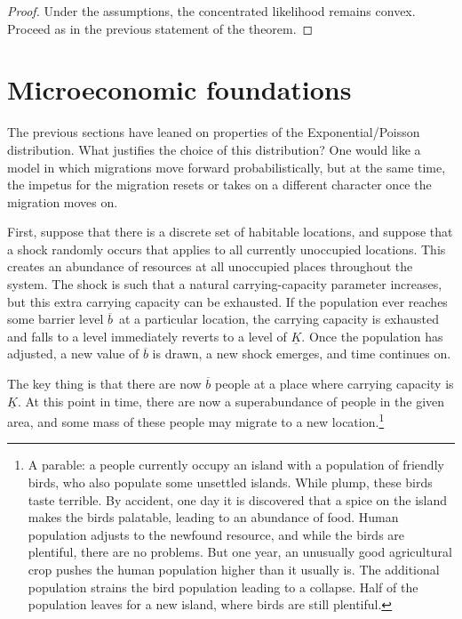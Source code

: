 \documentclass[11pt]{article}
\begin{document}
\begin{proof}
Under the assumptions, the concentrated likelihood remains convex. Proceed as in the previous statement of the theorem.
\end{proof}

\section{Microeconomic foundations}

The previous sections have leaned on properties of the Exponential/Poisson distribution. What justifies the choice of this distribution? One would like a model in which migrations move forward probabilistically, but at the same time, the impetus for the migration resets or takes on a different character once the migration moves on. 

First, suppose that there is a discrete set of habitable locations, and suppose that a shock randomly occurs that applies to all currently unoccupied locations. This creates an abundance of resources at all unoccupied places throughout the system. The shock is such that a natural carrying-capacity parameter increases, but this extra carrying capacity can be exhausted. If the population ever reaches some barrier level $\overline{b}$\ at a particular location, the carrying capacity is exhausted and falls to a level  immediately reverts to a level of $\underline{K}$. Once the population has adjusted, a new value of $\overline{b}$ is drawn, a new shock emerges, and time continues on. 

The key thing is that there are now $\overline{b}$ people at a place where carrying capacity is $\underline{K}$. At this point in time, there are now a superabundance of people in the given area, and some mass of these people may migrate to a new location.\footnote{A parable: a people currently occupy an island with a population of friendly birds, who also populate some unsettled islands. While plump, these birds taste terrible. By accident, one day it is discovered that a spice on the island makes the birds palatable, leading to an abundance of food. Human population adjusts to the newfound resource, and while the birds are plentiful, there are no problems. But one year, an unusually good agricultural crop pushes the human population higher than it usually is. The additional population strains the bird population leading to a collapse. Half of the population leaves for a new island, where birds are still plentiful.}
\end{document}
